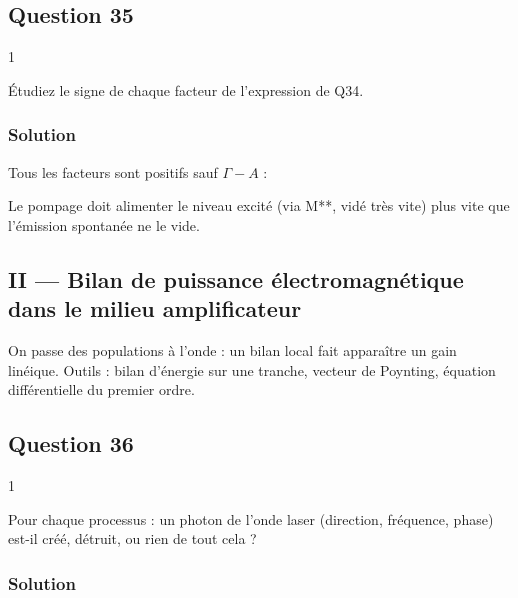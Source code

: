\documentclass[11pt,a4paper]{article}
\newcommand{\equationajustee}[1]{%
  \sbox{\boiteequation}{$\displaystyle #1$}%
  \ifdim\wd\boiteequation>\linewidth
    \[\resizebox{\linewidth}{!}{\usebox{\boiteequation}}\]%
  \else
    \[#1\]%
  \fi}
\begin{document}
\hypertarget{question-35}{%
\subsection{Question 35}\label{question-35}}

\begin{indication}{1}

Étudiez le signe de chaque facteur de l'expression de Q34.

\end{indication}

\hypertarget{solution-34}{%
\subsubsection{Solution}\label{solution-34}}

Tous les facteurs sont positifs sauf \(\Gamma-A\) :

\equationajustee{\boxed{\Delta n>0\iff\Gamma>A}}

Le pompage doit alimenter le niveau excité (via M**, vidé très vite) plus vite que l'émission spontanée ne le vide.

\hypertarget{ii-bilan-de-puissance-uxe9lectromagnuxe9tique-dans-le-milieu-amplificateur}{%
\subsection{II --- Bilan de puissance électromagnétique dans le milieu amplificateur}\label{ii-bilan-de-puissance-uxe9lectromagnuxe9tique-dans-le-milieu-amplificateur}}

On passe des populations à l'onde : un bilan local fait apparaître un gain linéique. Outils : bilan d'énergie sur une tranche, vecteur de Poynting, équation différentielle du premier ordre.

\hypertarget{question-36}{%
\subsection{Question 36}\label{question-36}}

\begin{indication}{1}

Pour chaque processus : un photon de l'onde laser (direction, fréquence, phase) est-il créé, détruit, ou rien de tout cela ?

\end{indication}

\hypertarget{solution-35}{%
\subsubsection{Solution}\label{solution-35}}
\end{document}
